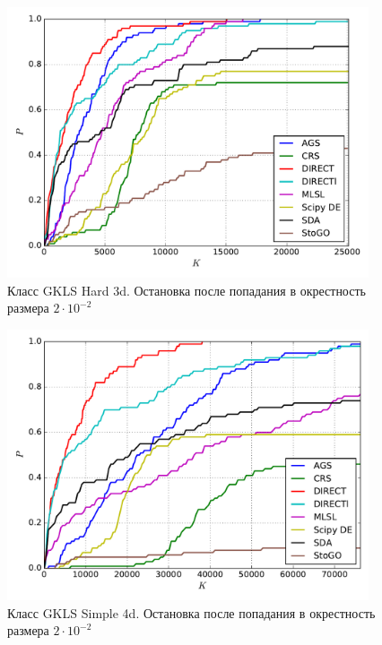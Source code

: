 \documentclass[a4paper]{article}
\begin{document}
\begin{figure}[H]
  \center
  \includegraphics[width=0.95\textwidth]{../experiments/gklsh3d/cmc.pdf}
  \caption{Класс GKLS Hard 3d. Остановка после попадания в окрестность размера $2\cdot10^{-2}$}
  \label{fig:}
\end{figure}


\begin{figure}[H]
  \center
  \includegraphics[width=0.95\textwidth]{../experiments/gklss4d/cmc.pdf}
  \caption{Класс GKLS Simple 4d. Остановка после попадания в окрестность размера $2\cdot10^{-2}$}
  \label{fig:}
\end{figure}

\end{document}
